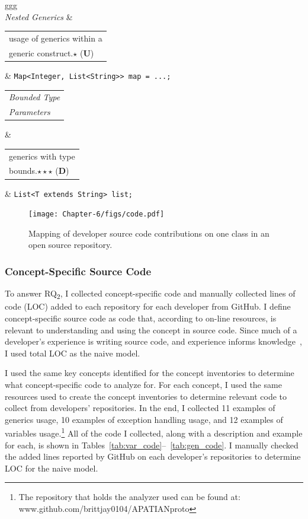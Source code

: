 \begin{table}
\begin{tabular}{ggg}
		\\
	    \textit{Nested Generics}        & \begin{tabular}[c]{@{}l@{}}usage of generics within a \\generic construct.\textbf{$\star$} (\textbf{U}) \end{tabular}                                                                              & \small{\texttt{Map<Integer, List<String>> map = ...;}} \\
		\begin{tabular}[c]{@{}l@{}}\textit{Bounded Type} \\\textit{Parameters} \end{tabular}  & \begin{tabular}[c]{@{}l@{}}generics with type \\bounds.\textbf{$\star\star\star$}  (\textbf{D}) \end{tabular}                                                                                               & \small{\texttt{List<T extends String> list;}}                             \\
		\bottomrule
	\end{tabular}
\end{table}

\begin{figure} [ht]
	\centering
	\texttt{[image: Chapter-6/figs/code.pdf]}
	\caption{Mapping of developer source code contributions on one class in an open source repository.}
	\label{fig:code}
\end{figure}

\subsubsection{Concept-Specific Source Code}

To answer RQ\textsubscript{2}, I collected concept-specific code and manually collected lines of code (LOC) added to each repository for each developer from GitHub. 
I define concept-specific source code as code that, according to on-line resources, is relevant to understanding and using the concept in source code. 
Since much of a developer's experience is writing source code, and experience informs knowledge~\cite{bromme1995fusing,argote2011organizational}, I used total LOC as the naive model.

I used the same key concepts identified for the concept inventories to determine what concept-specific code to analyze for. 
For each concept, I used the same resources used to create the concept inventories to determine relevant code to collect from developers' repositories.
In the end, I collected 11 examples of generics usage, 10 examples of exception handling usage, and 12 examples of variables usage.\footnote{The repository that holds the analyzer used can be found at: www.github.com/brittjay0104/APATIANproto} All of the code I collected, along with a description and example for each, is shown in Tables~\ref{tab:var_code}--~\ref{tab:gen_code}. 
I manually checked the added lines reported by GitHub on each developer's repositories to determine LOC for the naive model.

